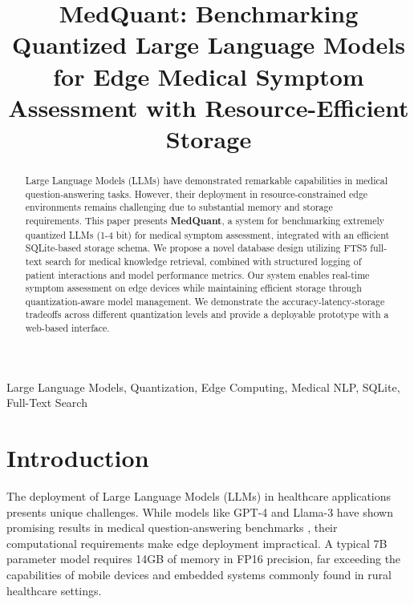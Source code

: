 \documentclass[conference]{IEEEtran}
\begin{document}
\title{MedQuant: Benchmarking Quantized Large Language Models for Edge Medical Symptom Assessment with Resource-Efficient Storage}

\author{
}

\maketitle

\begin{abstract}
Large Language Models (LLMs) have demonstrated remarkable capabilities in medical question-answering tasks. However, their deployment in resource-constrained edge environments remains challenging due to substantial memory and storage requirements. This paper presents \textbf{MedQuant}, a system for benchmarking extremely quantized LLMs (1-4 bit) for medical symptom assessment, integrated with an efficient SQLite-based storage schema. We propose a novel database design utilizing FTS5 full-text search for medical knowledge retrieval, combined with structured logging of patient interactions and model performance metrics. Our system enables real-time symptom assessment on edge devices while maintaining efficient storage through quantization-aware model management. We demonstrate the accuracy-latency-storage tradeoffs across different quantization levels and provide a deployable prototype with a web-based interface.
\end{abstract}

\begin{IEEEkeywords}
Large Language Models, Quantization, Edge Computing, Medical NLP, SQLite, Full-Text Search
\end{IEEEkeywords}

\section{Introduction}

The deployment of Large Language Models (LLMs) in healthcare applications presents unique challenges. While models like GPT-4 and Llama-3 have shown promising results in medical question-answering benchmarks \cite{jin2021disease}, their computational requirements make edge deployment impractical. A typical 7B parameter model requires 14GB of memory in FP16 precision, far exceeding the capabilities of mobile devices and embedded systems commonly found in rural healthcare settings.
\end{document}
